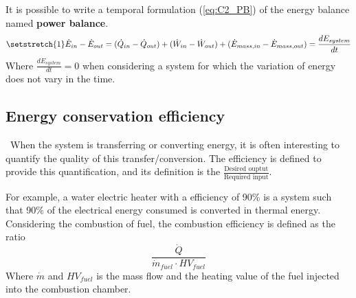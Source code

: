 It is possible to write a temporal formulation (\ref{eq:C2_PB}) of the energy balance named \textbf{power balance}.  
\begin{equation}
\setstretch{1}
    \dot{E}_{in} - \dot{E}_{out} = (\dot{Q}_{in} - \dot{Q}_{out}) + (\dot{W}_{in} - \dot{W}_{out}) + (\dot{E}_{mass,in} - \dot{E}_{mass,out}) = \frac{dE_{system}}{dt} \label{eq:C2_PB}
\end{equation}
Where $\frac{dE_{system}}{dt}=0$ when considering a system for which the variation of energy does not vary in the time.
\subsection{Energy conservation efficiency}
\quad\, When the system is transferring or converting energy, it is often interesting to quantify the quality of this transfer/conversion. The efficiency is defined to provide this quantification, and its definition is the
$\frac{\text{Desired ouptut}}{\text{Required input}}$. 

For example, a water electric heater with a efficiency of 90\% is a system such that 90\% of the electrical energy consumed is converted in thermal energy.  
Considering the combustion of fuel, the combustion efficiency is defined as the ratio
$$ \frac{\dot{Q}}{\dot{m}_{fuel}\cdot HV_{fuel}}$$
Where $\dot{m}$  and $HV_{fuel}$ is the mass flow and the heating value of the fuel injected into the combustion chamber.